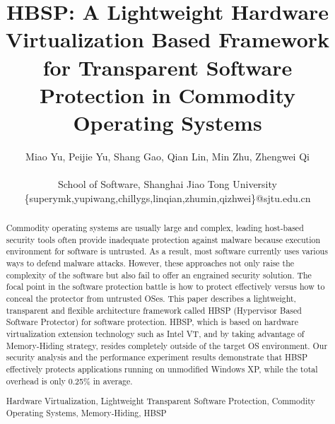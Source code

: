 \documentclass[conference]{IEEEtran}
\begin{document}
%
\title{HBSP: A Lightweight Hardware Virtualization Based Framework for Transparent Software Protection in Commodity Operating Systems}


\iffalse
\author{
\IEEEauthorblockN{Miao Yu}
\IEEEauthorblockA{School of Software,\\Shanghai Jiaotong University\\
Email: yumiao@sjtu.edu.cn}
\and
\IEEEauthorblockN{Peijie Yu}
\IEEEauthorblockA{School of Software,\\Shanghai Jiao Tong University\\
Email: yupeijie@sjtu.edu.cn} \and \IEEEauthorblockN{Shang Gao}
\IEEEauthorblockA{School of Software,\\Shanghai Jiaotong
University\\Email: gaoshang@sjtu.edu.cn}}
\fi

\author{Miao Yu, Peijie Yu, Shang Gao, Qian Lin, Min Zhu, Zhengwei
Qi\\ \\
School of Software, Shanghai Jiao Tong University\\
\{superymk,yupiwang,chillygs,linqian,zhumin,qizhwei\}@sjtu.edu.cn}


\maketitle

\begin{abstract}
Commodity operating systems are usually large and complex, leading
host-based security tools often provide inadequate protection
against malware because execution environment for software is
untrusted. As a result, most software currently uses various ways to
defend malware attacks. However, these approaches not only raise the
complexity of the software but also fail to offer an engrained
security solution. The focal point in the software protection battle
is how to protect effectively versus how to conceal the protector
from untrusted OSes. This paper describes a lightweight, transparent
and flexible architecture framework called HBSP (Hypervisor Based
Software Protector) for software protection. HBSP, which is based on
hardware virtualization extension technology such as Intel VT, and
by taking advantage of Memory-Hiding strategy, resides completely
outside of the target OS environment.  Our security analysis and the
performance experiment results demonstrate that HBSP effectively
protects applications running on unmodified Windows XP, while the
total overhead is only 0.25\% in average.

\bigskip

\begin{IEEEkeywords}
Hardware Virtualization, Lightweight Transparent Software
Protection, Commodity Operating Systems, Memory-Hiding, HBSP
\end{IEEEkeywords}

\end{abstract}
\end{document}
